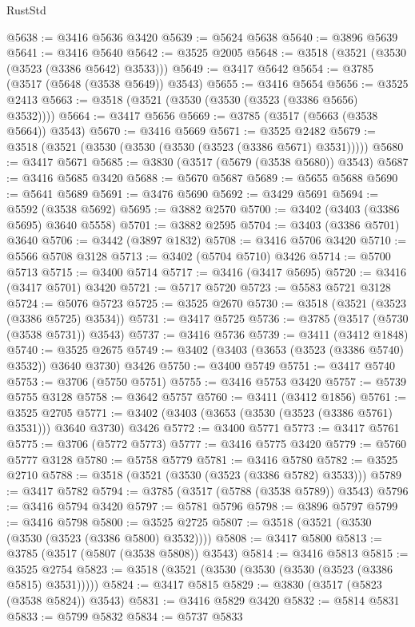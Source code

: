 \begin{lexlean}{RustStd}
\begin{coremodule}
@5638 := @3416 @5636 @3420
@5639 := @5624 @5638
@5640 := @3896 @5639
@5641 := @3416 @5640
@5642 := @3525 @2005
@5648 := @3518 (@3521 (@3530 (@3523 (@3386 @5642) @3533)))
@5649 := @3417 @5642
@5654 := @3785 (@3517 (@5648 (@3538 @5649)) @3543)
@5655 := @3416 @5654
@5656 := @3525 @2413
@5663 := @3518 (@3521 (@3530 (@3530 (@3523 (@3386 @5656) @3532))))
@5664 := @3417 @5656
@5669 := @3785 (@3517 (@5663 (@3538 @5664)) @3543)
@5670 := @3416 @5669
@5671 := @3525 @2482
@5679 := @3518 (@3521 (@3530 (@3530 (@3530 (@3523 (@3386 @5671) @3531)))))
@5680 := @3417 @5671
@5685 := @3830 (@3517 (@5679 (@3538 @5680)) @3543)
@5687 := @3416 @5685 @3420
@5688 := @5670 @5687
@5689 := @5655 @5688
@5690 := @5641 @5689
@5691 := @3476 @5690
@5692 := @3429 @5691
@5694 := @5592 (@3538 @5692)
@5695 := @3882 @2570
@5700 := @3402 (@3403 (@3386 @5695) @3640 @5558)
@5701 := @3882 @2595
@5704 := @3403 (@3386 @5701) @3640
@5706 := @3442 (@3897 @1832)
@5708 := @3416 @5706 @3420
@5710 := @5566 @5708 @3128
@5713 := @3402 (@5704 @5710) @3426
@5714 := @5700 @5713
@5715 := @3400 @5714
@5717 := @3416 (@3417 @5695)
@5720 := @3416 (@3417 @5701) @3420
@5721 := @5717 @5720
@5723 := @5583 @5721 @3128
@5724 := @5076 @5723
@5725 := @3525 @2670
@5730 := @3518 (@3521 (@3523 (@3386 @5725) @3534))
@5731 := @3417 @5725
@5736 := @3785 (@3517 (@5730 (@3538 @5731)) @3543)
@5737 := @3416 @5736
@5739 := @3411 (@3412 @1848)
@5740 := @3525 @2675
@5749 := @3402 (@3403 (@3653 (@3523 (@3386 @5740) @3532)) @3640 @3730) @3426
@5750 := @3400 @5749
@5751 := @3417 @5740
@5753 := @3706 (@5750 @5751)
@5755 := @3416 @5753 @3420
@5757 := @5739 @5755 @3128
@5758 := @3642 @5757
@5760 := @3411 (@3412 @1856)
@5761 := @3525 @2705
@5771 := @3402 (@3403 (@3653 (@3530 (@3523 (@3386 @5761) @3531))) @3640 @3730) @3426
@5772 := @3400 @5771
@5773 := @3417 @5761
@5775 := @3706 (@5772 @5773)
@5777 := @3416 @5775 @3420
@5779 := @5760 @5777 @3128
@5780 := @5758 @5779
@5781 := @3416 @5780
@5782 := @3525 @2710
@5788 := @3518 (@3521 (@3530 (@3523 (@3386 @5782) @3533)))
@5789 := @3417 @5782
@5794 := @3785 (@3517 (@5788 (@3538 @5789)) @3543)
@5796 := @3416 @5794 @3420
@5797 := @5781 @5796
@5798 := @3896 @5797
@5799 := @3416 @5798
@5800 := @3525 @2725
@5807 := @3518 (@3521 (@3530 (@3530 (@3523 (@3386 @5800) @3532))))
@5808 := @3417 @5800
@5813 := @3785 (@3517 (@5807 (@3538 @5808)) @3543)
@5814 := @3416 @5813
@5815 := @3525 @2754
@5823 := @3518 (@3521 (@3530 (@3530 (@3530 (@3523 (@3386 @5815) @3531)))))
@5824 := @3417 @5815
@5829 := @3830 (@3517 (@5823 (@3538 @5824)) @3543)
@5831 := @3416 @5829 @3420
@5832 := @5814 @5831
@5833 := @5799 @5832
@5834 := @5737 @5833

\end{coremodule}
\end{lexlean}
